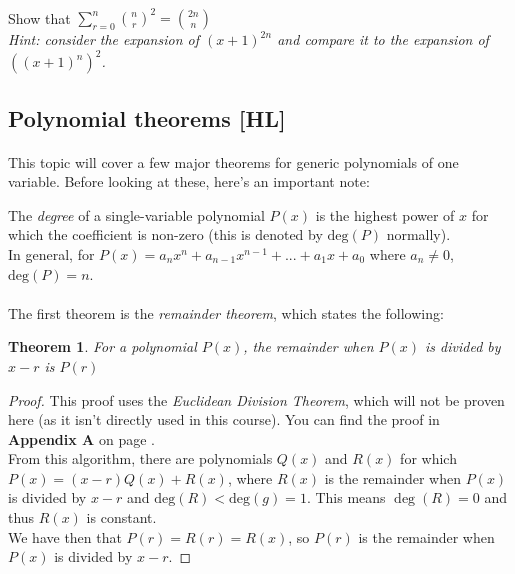 \documentclass[12pt, a4paper, titlepage, twoside]{article}
\newtheorem*{theorem*}{Theorem}
\begin{document}
	\paragraph{}
	 Show that $\displaystyle \sum_{r=0}^n {n \choose r}^2 = {{2n} \choose n}$\\ 
	
	\textit{Hint: consider the expansion of $(x+1)^{2n}$ and compare it to the expansion of $((x+1)^n)^2$.}
	
	
	\newpage
	
	\subsection{Polynomial theorems [HL]}
	
	\paragraph{}
	This topic will cover a few major theorems for generic polynomials of one variable. Before looking at these, here's an important
	note:\\
	
	\begin{kp}
		The \textit{degree} of a single-variable polynomial $P(x)$ is the highest power of $x$ for which the coefficient is non-zero
		(this is denoted by $\text{deg}(P)$ normally).\\
		
		In general, for $P(x) = a_n x^n + a_{n-1} x^{n-1} + ... + a_1 x + a_0$ where $a_n \neq 0$, $\text{deg}(P) = n$.
	\end{kp}
	
	\paragraph{}
	The first theorem is the \textit{remainder theorem}, which states the following:\\
	
	\begin{pf}
		\begin{theorem*}
			For a polynomial $P(x)$, the remainder when $P(x)$ is divided by $x-r$ is $P(r)$
		\end{theorem*}
		
		\tcbline
		
		\begin{proof}
			This proof uses the \textit{Euclidean Division Theorem}, which will not be proven here (as it isn't directly used in this course).
			You can find the proof in \textbf{Appendix A} on page \pageref*{apA:euc-div}.\\
			
			From this algorithm, there are polynomials $Q(x)$ and $R(x)$ for which $P(x) = (x-r)Q(x) + R(x)$, where
			$R(x)$ is the remainder when $P(x)$ is divided by $x-r$ and $\text{deg}(R) < \text{deg}(g) = 1$. This means $\deg(R) = 0$ and thus 
			$R(x)$ is constant.\\
			
			We have then that $P(r) = R(r) = R(x)$, so $P(r)$ is the remainder when $P(x)$ is divided by $x-r$.
		\end{proof}
	\end{pf} 
	
\end{document}
